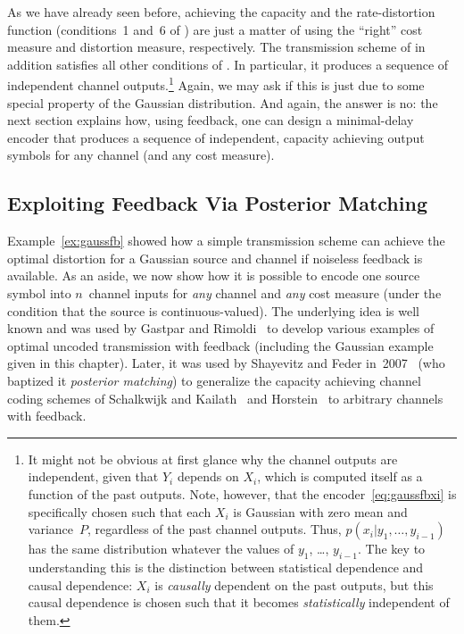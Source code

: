As we have already seen before, achieving the capacity and the
rate-dis\-tor\-tion function (conditions~1 and~6 of
) are just a matter of using the ``right'' cost
measure and distortion measure, respectively. The transmission scheme of
 in addition satisfies all other conditions of
. In particular, it produces a sequence of
independent channel outputs.\footnote{It might not be obvious at first glance
why the channel outputs are independent, given that $Y_i$ depends on $X_i$,
which is computed itself as a function of the past outputs. Note, however, that
the encoder~\eqref{eq:gaussfbxi} is specifically chosen such that each $X_i$ is
Gaussian with zero mean and variance~$P$, regardless of the past channel
outputs. Thus, $p(x_i | y_1, \dots, y_{i-1})$ has the same distribution whatever
the values of $y_1$, \dots, $y_{i-1}$. The key to understanding this is the
distinction between statistical dependence and causal dependence: $X_i$ is
\emph{causally} dependent on the past outputs, but this causal dependence is
chosen such that it becomes \emph{statistically} independent of them.} Again, we
may ask if this is just due to some special property of the Gaussian
distribution. And again, the answer is no: the next section explains how, using
feedback, one can design a minimal-delay encoder that produces a sequence of
independent, capacity achieving output symbols for any channel (and any cost
measure).


\subsection{Exploiting Feedback Via Posterior Matching}

Example~\ref{ex:gaussfb} showed how a simple transmission scheme can achieve the
optimal distortion for a Gaussian source and channel if noiseless feedback is
available.  As an aside, we now show how it is possible to encode one source
symbol into $n$~channel inputs for \emph{any} channel and \emph{any} cost
measure (under the condition that the source is continuous-valued). The
underlying idea is well known and was used by Gastpar and
Rimoldi~\cite{GastparR2003} to develop various examples of optimal uncoded
transmission with feedback (including the Gaussian example given in this
chapter). Later, it was used by Shayevitz and Feder
in~2007~\cite{ShayevitzF2007,ShayevitzF2008} (who baptized it \emph{posterior
matching}) to generalize the capacity achieving channel coding schemes of
Schalkwijk and Kailath~\cite{SchalkwijkK1966} and Horstein~\cite{Horstein1963}
to arbitrary channels with feedback.

